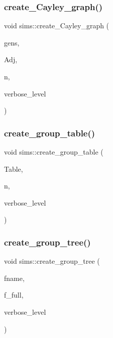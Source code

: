 \subsubsection{\texorpdfstring{create\+\_\+\+Cayley\+\_\+graph()}{create\_Cayley\_graph()}}
{\footnotesize\ttfamily void sims\+::create\+\_\+\+Cayley\+\_\+graph (\begin{DoxyParamCaption}\item[{\mbox{\hyperlink{classvector__ge}{vector\+\_\+ge}} $\ast$}]{gens,  }\item[{\mbox{\hyperlink{galois_8h_a09fddde158a3a20bd2dcadb609de11dc}{I\+NT}} $\ast$\&}]{Adj,  }\item[{\mbox{\hyperlink{galois_8h_a09fddde158a3a20bd2dcadb609de11dc}{I\+NT}} \&}]{n,  }\item[{\mbox{\hyperlink{galois_8h_a09fddde158a3a20bd2dcadb609de11dc}{I\+NT}}}]{verbose\+\_\+level }\end{DoxyParamCaption})}

\mbox{\label{classsims_a300c4eeca13fe79bca4145c63da09142}} 
\subsubsection{\texorpdfstring{create\+\_\+group\+\_\+table()}{create\_group\_table()}}
{\footnotesize\ttfamily void sims\+::create\+\_\+group\+\_\+table (\begin{DoxyParamCaption}\item[{\mbox{\hyperlink{galois_8h_a09fddde158a3a20bd2dcadb609de11dc}{I\+NT}} $\ast$\&}]{Table,  }\item[{\mbox{\hyperlink{galois_8h_a09fddde158a3a20bd2dcadb609de11dc}{I\+NT}} \&}]{n,  }\item[{\mbox{\hyperlink{galois_8h_a09fddde158a3a20bd2dcadb609de11dc}{I\+NT}}}]{verbose\+\_\+level }\end{DoxyParamCaption})}

\mbox{\label{classsims_a10ac0f054b6366025465e6775cb9983a}} 
\subsubsection{\texorpdfstring{create\+\_\+group\+\_\+tree()}{create\_group\_tree()}}
{\footnotesize\ttfamily void sims\+::create\+\_\+group\+\_\+tree (\begin{DoxyParamCaption}\item[{const \mbox{\hyperlink{galois_8h_ab6cc7b4aeb6ea31aba2b3fbfc83ff5e6}{B\+Y\+TE}} $\ast$}]{fname,  }\item[{\mbox{\hyperlink{galois_8h_a09fddde158a3a20bd2dcadb609de11dc}{I\+NT}}}]{f\+\_\+full,  }\item[{\mbox{\hyperlink{galois_8h_a09fddde158a3a20bd2dcadb609de11dc}{I\+NT}}}]{verbose\+\_\+level }\end{DoxyParamCaption})}

